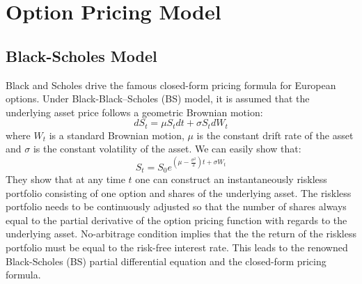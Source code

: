\documentclass[letterpaper,12pt,titlepage,oneside,final]{book}
\numberwithin{equation}{section}
\theoremstyle{definition}
\begin{document}
\section{Option Pricing Model}
\label{sec:pricing}
\subsection{Black-Scholes Model}
\label{sec:bs}


Black and Scholes \cite{black1973pricing} drive the famous closed-form pricing formula for European options. 
Under Black-Black–Scholes (BS) model, it is assumed that the underlying asset price follows a geometric Brownian motion:
\[
dS_t=\mu S_t dt+\sigma S_t dW_t
\]
where $W_t$ is a standard Brownian motion, $\mu$ is the constant drift rate of  the asset and $\sigma$ is the constant volatility of the asset. We can easily show that:
\[
S_t=S_0 e^{(\mu-\frac{\sigma^2}{2})t+\sigma W_t}
\]
They show that at any time $t$ one can construct an instantaneously riskless portfolio consisting of one option and shares of the underlying asset. The riskless portfolio needs to be continuously adjusted so that the number of shares always equal to the partial derivative of the option pricing function with regards to the underlying asset. No-arbitrage condition implies that the the return of the riskless portfolio must be equal to the risk-free interest rate. This leads to the renowned Black-Scholes (BS) partial differential equation and the closed-form pricing formula.
\end{document}
